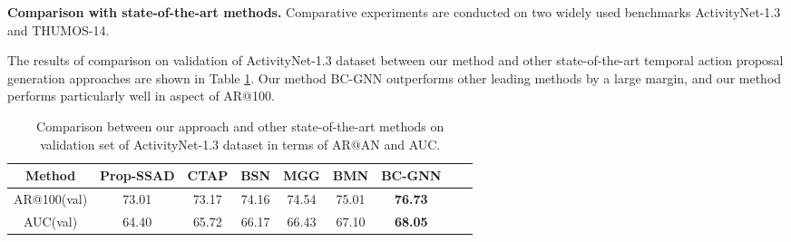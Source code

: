\documentclass[runningheads]{llncs}
\begin{document}
\noindent\textbf{Comparison with state-of-the-art methods.}
Comparative experiments are conducted on two widely used benchmarks ActivityNet-1.3 and THUMOS-14.

The results of comparison on validation of ActivityNet-1.3 dataset between our method and other state-of-the-art temporal action proposal generation approaches are shown in Table \ref{anet auc table}. Our method BC-GNN outperforms other leading methods by a large margin, and our method performs particularly well in aspect of AR@100.

\begin{table}
\setlength{\abovecaptionskip}{-.5cm}
\setlength{\belowcaptionskip}{-.1cm}
\caption{Comparison between our approach and other state-of-the-art methods on validation set of ActivityNet-1.3 dataset in terms of AR@AN and AUC.}
\setlength{\tabcolsep}{1mm}
\begin{center}
\begin{tabular}{ccccccccc}

\hline
Method       &Prop-SSAD \cite{SSAD} &CTAP \cite{CTAP}  & BSN \cite{BSN}   &MGG \cite{MGG}  &BMN \cite{BMN}  & BC-GNN  \\ \hline
AR@100(val)  & 73.01     & 73.17 & 74.16 & 74.54 & 75.01 & \textbf{76.73} \\
AUC(val)    & 64.40     & 65.72 & 66.17 & 66.43 & 67.10 & \textbf{68.05} \\ \hline

\end{tabular}
\end{center}
\label{anet auc table}
\end{table}
\end{document}
